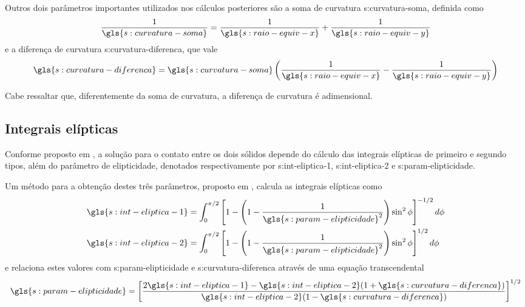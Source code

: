 \documentclass[12pt,oneside,english,brazil,lmodern,siglas,simbolos,cite=num]{ucsmonograph}
\begin{document}
	Outros dois parâmetros importantes utilizados nos cálculos posteriores são a soma de curvatura \gls{s:curvatura-soma}, definida como \cite{wijnant:1998}
	\begin{equation} \label{eqn:seco:curv-soma}
		\frac{1}{\gls{s:curvatura-soma}} =
		\frac{1}{\gls{s:raio-equiv-x}} + \frac{1}{\gls{s:raio-equiv-y}}
	\end{equation}
	e a diferença de curvatura \gls{s:curvatura-diferenca}, que vale
	\begin{equation} \label{eqn:seco:curv-diferenca}
		\gls{s:curvatura-diferenca} = \gls{s:curvatura-soma}
		\left( \frac{1}{\gls{s:raio-equiv-x}} - 
		\frac{1}{\gls{s:raio-equiv-y}} \right)
	\end{equation}
	
	Cabe ressaltar que, diferentemente da soma de curvatura, a diferença de curvatura é adimensional.
	
	\subsection{Integrais elípticas} \label{sec:int-elipticas}
	Conforme proposto em \cite{hertz:1881}, a solução para o contato entre os dois sólidos depende do cálculo das integrais elípticas de primeiro e segundo tipos, além do parâmetro de elipticidade, denotados respectivamente por \gls{s:int-eliptica-1}, \gls{s:int-eliptica-2} e \gls{s:param-elipticidade}.
	
	Um método para a obtenção destes três parâmetros, proposto em \cite{hamrock:1991}, calcula as integrais elípticas como
	\begin{align}
		\gls{s:int-eliptica-1} &= \int_{0}^{\pi/2} \left[ 1 - \left( 1-\frac{1}{\gls{s:param-elipticidade}^2}\right)\sin^2\phi
		\right]^{-1/2}d\phi \label{eqn:seco:int-elip-1} \\
		\gls{s:int-eliptica-2} &= \int_{0}^{\pi/2} \left[ 1 - \left(
		1-\frac{1}{\gls{s:param-elipticidade}^2}\right)\sin^2\phi
		\right]^{1/2}d\phi \label{eqn:seco:int-elip-2}
	\end{align}
	e relaciona estes valores com \gls{s:param-elipticidade} e \gls{s:curvatura-diferenca} através de uma equação transcendental
	\begin{equation} \label{eqn:seco:param-elip}
		\gls{s:param-elipticidade} = \left[ \frac{
		2\gls{s:int-eliptica-1} - \gls{s:int-eliptica-2}(
		1+\gls{s:curvatura-diferenca})}{
		\gls{s:int-eliptica-2}(1-\gls{s:curvatura-diferenca})}
		\right]^{1/2}
	\end{equation}
	
\end{document}
